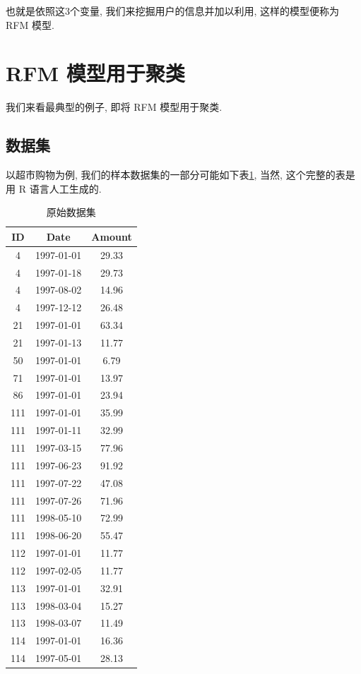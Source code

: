 \documentclass[a4paper,UTF8]{ctexart}
\theoremstyle{plain} \newtheorem{theorem}{定理}[section]
\theoremstyle{plain} \newtheorem{definition}{定义}[section]
\theoremstyle{plain} \newtheorem{lemma}{引理}[section]
\theoremstyle{plain} \newtheorem{proposition}{命题}[section]
\theoremstyle{plain} \newtheorem{example}{例}[section]
\theoremstyle{plain} \newtheorem{remark}{注}[section]
\theoremstyle{plain} \newtheorem{corollary}{推论}[section]
\begin{document}
也就是依照这$3$个变量, 我们来挖掘用户的信息并加以利用, 这样的模型便称为 RFM 模型.


\section{RFM 模型用于聚类}
我们来看最典型的例子, 即将 RFM 模型用于聚类. 

\subsection{数据集}
以超市购物为例, 我们的样本数据集的一部分可能如下表\ref{rawdata}, 当然, 这个完整的表是用 R 语言人工生成的.
\begin{table}[!htb]
\centering
\caption{原始数据集}
\label{rawdata}
\begin{tabular}{ccc}
	\hline
    \textbf{ID} & \textbf{Date} & \textbf{Amount} \\
    \hline
	4 & 1997-01-01 & 29.33 \\ 
	\hline
	4 & 1997-01-18 & 29.73 \\ 
	\hline
	4 & 1997-08-02 & 14.96 \\ 
	\hline
	4 & 1997-12-12 & 26.48 \\ 
	\hline
	21 & 1997-01-01 & 63.34 \\ 
	\hline
	21 & 1997-01-13 & 11.77 \\ 
	\hline
	50 & 1997-01-01 & 6.79 \\ 
	\hline
	71 & 1997-01-01 & 13.97 \\ 
	\hline
	86 & 1997-01-01 & 23.94 \\ 
	\hline
	111 & 1997-01-01 & 35.99 \\ 
	\hline
	111 & 1997-01-11 & 32.99 \\ 
	\hline 
	111 & 1997-03-15 & 77.96 \\ 
	\hline
	111 & 1997-06-23 & 91.92 \\ 
	\hline
	111 & 1997-07-22 & 47.08 \\ 
	\hline 
	111 & 1997-07-26 & 71.96 \\ 
	\hline
	111 & 1998-05-10 & 72.99 \\ 
	\hline
	111 & 1998-06-20 & 55.47 \\ 
	\hline
	112 & 1997-01-01 & 11.77 \\ 
	\hline
	112 & 1997-02-05 & 11.77 \\ 
	\hline
	113 & 1997-01-01 & 32.91 \\ 
	\hline
	113 & 1998-03-04 & 15.27 \\ 
	\hline 
	113 & 1998-03-07 & 11.49 \\ 
	\hline
	114 & 1997-01-01 & 16.36 \\ 
	\hline
	114 & 1997-05-01 & 28.13 \\
	\hline
\end{tabular}
\end{table}
\end{document}
